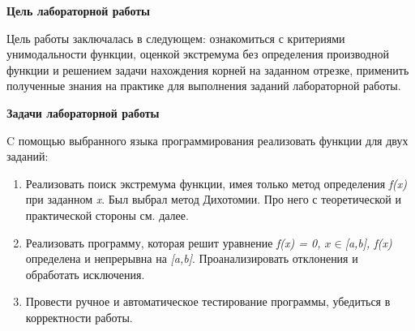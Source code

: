 \textbf{Цель лабораторной работы}
\vspace{0.5cm}

Цель работы заключалась в следующем: ознакомиться с критериями унимодальности функции, оценкой экстремума без определения производной функции и решением задачи нахождения корней на заданном отрезке, применить полученные знания на практике для выполнения заданий лабораторной работы. 


\vspace{2cm}

\textbf{Задачи лабораторной работы}
\vspace{0.5cm}

C помощью выбранного языка программирования реализовать функции для двух заданий:
\begin{enumerate}
    \item Реализовать поиск экстремума функции, имея только метод определения \textit{f(x)} при заданном \textit{x}. Был выбрал метод Дихотомии. Про него с теоретической и практической стороны см. далее.
    \item Реализовать программу, которая решит уравнение \textit{f(x) = 0, $x\in$[a,b], f(x)} определена и непрерывна на \textit{[a,b]}. Проанализировать отклонения и обработать исключения.
    \item Провести ручное и автоматическое тестирование программы, убедиться в корректности работы.
\end{enumerate}